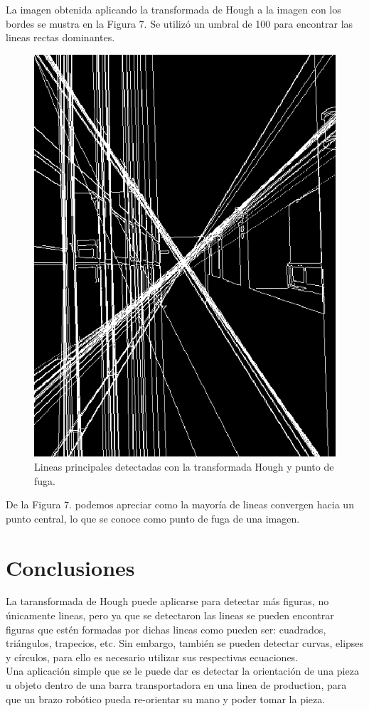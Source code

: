 \documentclass[conference]{IEEEtran}
\begin{document}
\newpage
La imagen obtenida aplicando la transformada de Hough a la imagen con los bordes se mustra en la Figura 7. Se utiliz\'o un umbral de 100 para encontrar las lineas rectas dominantes.

\begin{figure}[h]
	\setlength{\unitlength}{0.105in}
	\centering
	\includegraphics[scale=0.35]{./images/lineas.png}
	\caption{ Lineas principales detectadas con la transformada Hough y punto de fuga. }
\end{figure}

De la Figura 7. podemos apreciar como la mayor\'ia de lineas convergen hacia un punto central, lo que se conoce como punto de fuga de una imagen. \\

\section{Conclusiones}
La taransformada de Hough puede aplicarse para detectar m\'as figuras, no \'unicamente lineas, pero ya que se detectaron las lineas se pueden encontrar figuras que est\'en formadas por dichas lineas como pueden ser: cuadrados, tri\'angulos, trapecios, etc. Sin embargo, tambi\'en se pueden detectar curvas, elipses y c\'irculos, para ello es necesario utilizar sus respectivas ecuaciones.\\
Una aplicaci\'on simple que se le puede dar es detectar la orientaci\'on de una pieza u objeto dentro de una barra transportadora en una linea de production, para que un brazo rob\'otico pueda re-orientar su mano y poder tomar la pieza.
\end{document}
